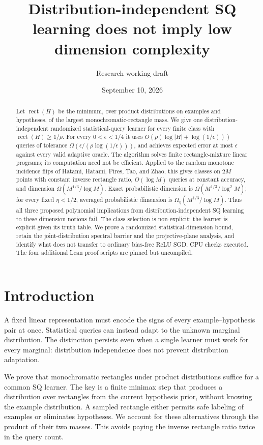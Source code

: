 \documentclass[11pt]{article}
\title{Distribution-independent SQ learning does not imply low dimension complexity}
\author{Research working draft}
\date{September 10, 2026}
\DeclareMathOperator{\rect}{rect}
\newcommand{\1}{\mathbf 1}
\begin{document}
\maketitle
\begin{abstract}
Let $\rect(H)$ be the minimum, over product distributions on examples and hypotheses, of the largest monochromatic-rectangle mass. We give one distribution-independent randomized statistical-query learner for every finite class with $\rect(H)\ge1/\rho$. For every $0<\epsilon<1/4$ it uses $O(\rho(\log|H|+\log(1/\epsilon)))$ queries of tolerance $\Omega(\epsilon/(\rho\log(1/\epsilon)))$, and achieves expected error at most $\epsilon$ against every valid adaptive oracle. The algorithm solves finite rectangle-mixture linear programs; its computation need not be efficient. Applied to the random monotone incidence flips of Hatami, Hatami, Pires, Tao, and Zhao, this gives classes on $2M$ points with constant inverse rectangle ratio, $O(\log M)$ queries at constant accuracy, and dimension $\Omega(M^{1/3}/\log M)$. Exact probabilistic dimension is $\Omega(M^{1/3}/\log^2 M)$; for every fixed $\eta<1/2$, averaged probabilistic dimension is $\Omega_\eta(M^{1/3}/\log M)$. Thus all three proposed polynomial implications from distribution-independent SQ learning to these dimension notions fail. The class selection is non-explicit; the learner is explicit given its truth table. We prove a randomized statistical-dimension bound, retain the joint-distribution spectral barrier and the projective-plane analysis, and identify what does not transfer to ordinary bias-free ReLU SGD. CPU checks executed. The four additional Lean proof scripts are pinned but uncompiled.
\end{abstract}

\section{Introduction}
A fixed linear representation must encode the signs of every example--hypothesis pair at once. Statistical queries can instead adapt to the unknown marginal distribution. The distinction persists even when a single learner must work for every marginal: distribution independence does not prevent distribution adaptation.

We prove that monochromatic rectangles under product distributions suffice for a common SQ learner. The key is a finite minimax step that produces a distribution over rectangles from the current hypothesis prior, without knowing the example distribution. A sampled rectangle either permits safe labeling of examples or eliminates hypotheses. We account for these alternatives through the product of their two masses. This avoids paying the inverse rectangle ratio twice in the query count.
\end{document}
